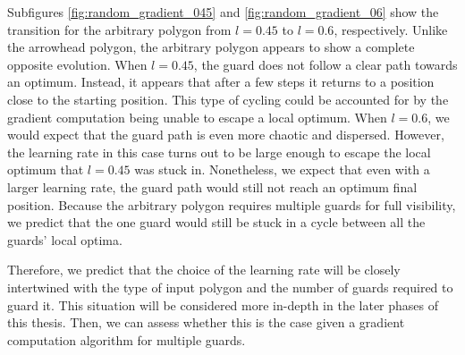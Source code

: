 Subfigures \ref{fig:random_gradient_045} and \ref{fig:random_gradient_06} show the transition for the arbitrary polygon from $l = 0.45$ to $l = 0.6$, respectively. Unlike the arrowhead polygon, the arbitrary polygon appears to show a complete opposite evolution. When $l = 0.45$, the guard does not follow a clear path towards an optimum. Instead, it appears that after a few steps it returns to a position close to the starting position. This type of cycling could be accounted for by the gradient computation being unable to escape a local optimum. When $l = 0.6$, we would expect that the guard path is even more chaotic and dispersed. However, the learning rate in this case turns out to be large enough to escape the local optimum that $l = 0.45$ was stuck in. Nonetheless, we expect that even with a larger learning rate, the guard path would still not reach an optimum final position. Because the arbitrary polygon requires multiple guards for full visibility, we predict that the one guard would still be stuck in a cycle between all the guards' local optima.

Therefore, we predict that the choice of the learning rate will be closely intertwined with the type of input polygon and the number of guards required to guard it. This situation will be considered more in-depth in the later phases of this thesis. Then, we can assess whether this is the case given a gradient computation algorithm for multiple guards.